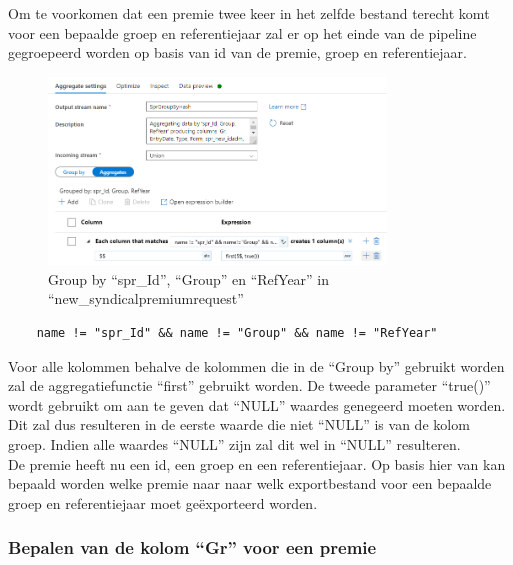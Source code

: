 Om te voorkomen dat een premie twee keer in het zelfde bestand terecht komt voor een bepaalde groep en referentiejaar zal er op het einde van de pipeline gegroepeerd worden op basis van id van de premie, groep en referentiejaar.

\begin{figure}[H]
    \centering
    \includegraphics[width=0.8\textwidth]{./graphics/adf/group_by_2.png}
    \caption{Group by ``spr\_Id'', ``Group'' en ``RefYear'' in ``new\_syndicalpremiumrequest''}
\end{figure}

\begin{verbatim}
    name != "spr_Id" && name != "Group" && name != "RefYear"
\end{verbatim}

Voor alle kolommen behalve de kolommen die in de ``Group by'' gebruikt worden zal de aggregatiefunctie ``first'' gebruikt worden. De tweede parameter ``true()'' wordt gebruikt om aan te geven dat ``NULL'' waardes genegeerd moeten worden. Dit zal dus resulteren in de eerste waarde die niet ``NULL'' is van de kolom groep. Indien alle waardes ``NULL'' zijn zal dit wel in ``NULL'' resulteren. \\

De premie heeft nu een id, een groep en een referentiejaar. Op basis hier van kan bepaald worden welke premie naar naar welk exportbestand voor een bepaalde groep en referentiejaar moet geëxporteerd worden.



\subsubsection{Bepalen van de kolom ``Gr'' voor een premie}

